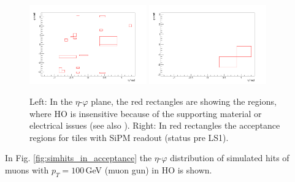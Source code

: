 			\begin{figure}[htbp]
				\centering
				\includegraphics[width=0.45\textwidth]{Figures/erdogan/deadregions.png}
				\includegraphics[width=0.45\textwidth]{Figures/erdogan/sipmregions.png}
				\caption{Left: In the $\eta$-$\varphi$ plane, the red rectangles are showing the regions, where HO is insensitive because of the supporting material or electrical issues (see also \cite{JINST}).
				Right:
				In red rectangles the acceptance regions for tiles with SiPM readout (status pre LS1).}
				\label{fig:ho_acceptance}
			\end{figure}
			In Fig. \ref{fig:simhits_in_acceptance} the $\eta$-$\varphi$ distribution of simulated hits of muons with $p_T = 100$\,GeV (muon gun) in HO is shown.
